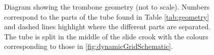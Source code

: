 \begin{figure}[t]
\begin{tikzpicture}[scale = 8]
    
    \end{tikzpicture}
    \caption{Diagram showing the trombone geometry (not to scale). Numbers correspond to the parts of the tube found in Table \ref{tab:geometry} and dashed lines highlight where the different parts are separated. The tube is split in the middle of the slide crook with the colours corresponding to those in \ref{fig:dynamicGridSchematic}.}
    \label{fig:tromboneSchematic}
\end{figure}